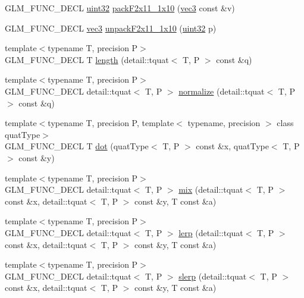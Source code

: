 \begin{CompactItemize}
\item 
GLM\_\-FUNC\_\-DECL \hyperlink{group__gtc__type__precision_g202b6a53c105fcb7e531f9b443518451}{uint32} \hyperlink{group__gtc__packing_g8c2a0eeee677ca4dafd9e093d9e81062}{packF2x11\_\-1x10} (\hyperlink{group__core__types_g1c47e8b3386109bc992b6c48e91b0be7}{vec3} const \&v)
\item 
GLM\_\-FUNC\_\-DECL \hyperlink{group__core__types_g1c47e8b3386109bc992b6c48e91b0be7}{vec3} \hyperlink{group__gtc__packing_g8b9c7991eb021d95c778bf5c0b2f7824}{unpackF2x11\_\-1x10} (\hyperlink{group__gtc__type__precision_g202b6a53c105fcb7e531f9b443518451}{uint32} p)
\item 
{\footnotesize template$<$typename T, precision P$>$ }\\GLM\_\-FUNC\_\-DECL T \hyperlink{group__gtc__quaternion_g286560b01bedb4e046ffb71de22464f4}{length} (detail::tquat$<$ T, P $>$ const \&q)
\item 
{\footnotesize template$<$typename T, precision P$>$ }\\GLM\_\-FUNC\_\-DECL detail::tquat$<$ T, P $>$ \hyperlink{group__gtc__quaternion_g396b587a47d7e611895b2c95892a2e17}{normalize} (detail::tquat$<$ T, P $>$ const \&q)
\item 
{\footnotesize template$<$typename T, precision P, template$<$ typename, precision $>$ class quatType$>$ }\\GLM\_\-FUNC\_\-DECL T \hyperlink{group__gtc__quaternion_g4ce8bce2b7dc8206a31cfb8e7b779b76}{dot} (quatType$<$ T, P $>$ const \&x, quatType$<$ T, P $>$ const \&y)
\item 
{\footnotesize template$<$typename T, precision P$>$ }\\GLM\_\-FUNC\_\-DECL detail::tquat$<$ T, P $>$ \hyperlink{group__gtc__quaternion_gd53916e67eedc8bb259548504b713350}{mix} (detail::tquat$<$ T, P $>$ const \&x, detail::tquat$<$ T, P $>$ const \&y, T const \&a)
\item 
{\footnotesize template$<$typename T, precision P$>$ }\\GLM\_\-FUNC\_\-DECL detail::tquat$<$ T, P $>$ \hyperlink{group__gtc__quaternion_g7bdb11ee6bfad4eafe2cb71337353ca4}{lerp} (detail::tquat$<$ T, P $>$ const \&x, detail::tquat$<$ T, P $>$ const \&y, T const \&a)
\item 
{\footnotesize template$<$typename T, precision P$>$ }\\GLM\_\-FUNC\_\-DECL detail::tquat$<$ T, P $>$ \hyperlink{group__gtc__quaternion_ga75cee4315cd8e7f15eaac3ea944106a}{slerp} (detail::tquat$<$ T, P $>$ const \&x, detail::tquat$<$ T, P $>$ const \&y, T const \&a)

\end{CompactItemize}
